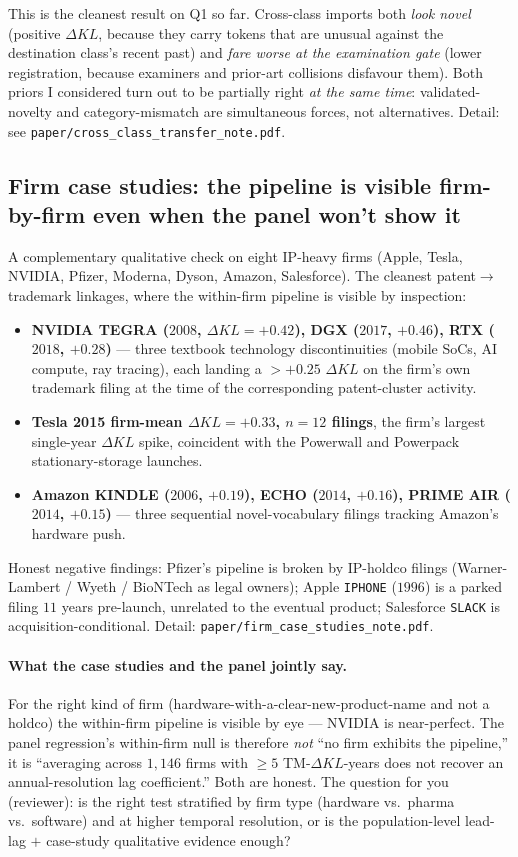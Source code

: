 \documentclass[11pt]{article}
\newcommand{\dkl}{\Delta KL}
\begin{document}
This is the cleanest result on Q1 so far. Cross-class imports both
\emph{look novel} (positive $\dkl$, because they carry tokens that
are unusual against the destination class's recent past) and
\emph{fare worse at the examination gate} (lower registration,
because examiners and prior-art collisions disfavour them). Both
priors I considered turn out to be partially right \emph{at the same
time}: validated-novelty and category-mismatch are simultaneous
forces, not alternatives. Detail: see \texttt{paper/cross\_class\_transfer\_note.pdf}.

\subsection*{Firm case studies: the pipeline is visible firm-by-firm even when the panel won't show it}

A complementary qualitative check on eight IP-heavy firms (Apple,
Tesla, NVIDIA, Pfizer, Moderna, Dyson, Amazon, Salesforce). The
cleanest patent$\to$trademark linkages, where the within-firm
pipeline is visible by inspection:
\begin{itemize}\setlength\itemsep{2pt}
\item \textbf{NVIDIA TEGRA ($2008$, $\dkl = +0.42$), DGX ($2017$,
$+0.46$), RTX ($2018$, $+0.28$)} --- three textbook technology
discontinuities (mobile SoCs, AI compute, ray tracing), each landing
a $> +0.25$ $\dkl$ on the firm's own trademark filing at the time
of the corresponding patent-cluster activity.
\item \textbf{Tesla 2015 firm-mean $\dkl = +0.33$, $n=12$ filings},
the firm's largest single-year $\dkl$ spike, coincident with the
Powerwall and Powerpack stationary-storage launches.
\item \textbf{Amazon KINDLE ($2006$, $+0.19$), ECHO ($2014$,
$+0.16$), PRIME AIR ($2014$, $+0.15$)} --- three sequential
novel-vocabulary filings tracking Amazon's hardware push.
\end{itemize}
Honest negative findings: Pfizer's pipeline is broken by IP-holdco
filings (Warner-Lambert / Wyeth / BioNTech as legal owners); Apple
\texttt{IPHONE} ($1996$) is a parked filing $11$ years pre-launch,
unrelated to the eventual product; Salesforce \texttt{SLACK} is
acquisition-conditional. Detail: \texttt{paper/firm\_case\_studies\_note.pdf}.

\paragraph{What the case studies and the panel jointly say.} For the
right kind of firm (hardware-with-a-clear-new-product-name and not a
holdco) the within-firm pipeline is visible by eye --- NVIDIA is
near-perfect. The panel regression's within-firm null is therefore
\emph{not} ``no firm exhibits the pipeline,'' it is ``averaging
across $1{,}146$ firms with $\geq 5$ TM-$\dkl$-years does not
recover an annual-resolution lag coefficient.'' Both are honest. The
question for you (reviewer): is the right test stratified by firm
type (hardware vs.\ pharma vs.\ software) and at higher temporal
resolution, or is the population-level lead-lag $+ $ case-study
qualitative evidence enough?
\end{document}
